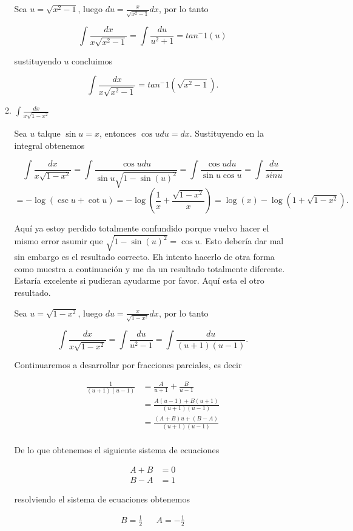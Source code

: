 \documentclass[letterpaper]{article}
\theoremstyle{definition}
\theoremstyle{lemathm}
\theoremstyle{lemademthm}
\begin{document}
\begin{enumerate}
\begin{enumerate}
			Sea $u = \sqrt{x^2-1}$, luego $du = \frac{x}{\sqrt{x^2-1}}dx$, por lo tanto

			\[\int \frac{dx}{x\sqrt{x^2-1}} = \int \frac{du}{u^2+1} = tan^-1(u)\]

			sustituyendo $u$ concluimos

			\[\int \frac{dx}{x\sqrt{x^2-1}} = tan^-1(\sqrt{x^2-1}).\]

            \item $\int \frac{dx}{x\sqrt{1-x^2}}$
			
			Sea $u$ talque $\sin u = x$, entonces $\cos u du = dx$. Sustituyendo en la integral obtenemos

			\[\int \frac{dx}{x\sqrt{1-x^2}} = \int \frac{\cos u du}{\sin u\sqrt{1-\sin (u)^2}} = \int \frac{\cos u du}{\sin u \cos u} = \int \frac{du}{sin u}\]
			\[ = -\log(\csc u + \cot u) = -\log(\frac{1}{x} + \frac{\sqrt{1-x^2}}{x}) = \log(x) - \log(1 + \sqrt{1-x^2}).\]

			Aquí ya estoy perdido totalmente confundido porque vuelvo hacer el mismo error asumir que $\sqrt{1-\sin(u)^2} = \cos u$. Esto debería dar mal sin embargo es el resultado correcto. Eh intento hacerlo de otra forma como muestra a continuación y me da un resultado totalmente diferente. Estaría excelente si pudieran ayudarme por favor. Aquí esta el otro resultado.

			Sea $u = \sqrt{1-x^2}$, luego $du = \frac{x}{\sqrt{1-x^2}}dx$, por lo tanto

			\[\int \frac{dx}{x\sqrt{1-x^2}} = \int \frac{du}{u^2-1} = \int \frac{du}{(u+1)(u-1)}.\]

			Continuaremos a desarrollar por fracciones parciales, es decir

			\begin{align*}
				\frac{1}{(u+1)(u-1)} &= \frac{A}{u+1} + \frac{B}{u-1}\\
				&= \frac{A(u-1) + B(u+1)}{(u+1)(u-1)}\\
				&= \frac{(A+B)u + (B-A)}{(u+1)(u-1)}\\
			\end{align*}

			De lo que obtenemos el siguiente sistema de ecuaciones

			\begin{align*}
				A + B &= 0\\
				B - A &= 1
			\end{align*}

			resolviendo el sistema de ecuaciones obtenemos

			\begin{align*}
				B = \frac{1}{2} && A = -\frac{1}{2}
			\end{align*}


\end{enumerate}
\end{enumerate}
\end{document}
